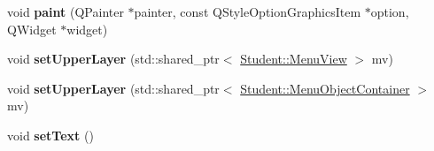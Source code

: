 \begin{DoxyCompactItemize}
\item 
\hypertarget{class_student_1_1_menu_scene_item_ad3df62599b58d4458b7724fc5b1cc1f5}{void {\bfseries paint} (Q\-Painter $\ast$painter, const Q\-Style\-Option\-Graphics\-Item $\ast$option, Q\-Widget $\ast$widget)}\label{class_student_1_1_menu_scene_item_ad3df62599b58d4458b7724fc5b1cc1f5}

\item 
\hypertarget{class_student_1_1_menu_scene_item_aa1612fa21757519343869ea98e44036a}{void {\bfseries set\-Upper\-Layer} (std\-::shared\-\_\-ptr$<$ \hyperlink{class_student_1_1_menu_view}{Student\-::\-Menu\-View} $>$ mv)}\label{class_student_1_1_menu_scene_item_aa1612fa21757519343869ea98e44036a}

\item 
\hypertarget{class_student_1_1_menu_scene_item_aa14dc67568e84c4d4d4b043e3342e8eb}{void {\bfseries set\-Upper\-Layer} (std\-::shared\-\_\-ptr$<$ \hyperlink{class_student_1_1_menu_object_container}{Student\-::\-Menu\-Object\-Container} $>$ mv)}\label{class_student_1_1_menu_scene_item_aa14dc67568e84c4d4d4b043e3342e8eb}

\item 
\hypertarget{class_student_1_1_menu_scene_item_ac5e3370e5ecad3a62ec200e0e0d5c8dc}{void {\bfseries set\-Text} ()}\label{class_student_1_1_menu_scene_item_ac5e3370e5ecad3a62ec200e0e0d5c8dc}

\end{DoxyCompactItemize}
